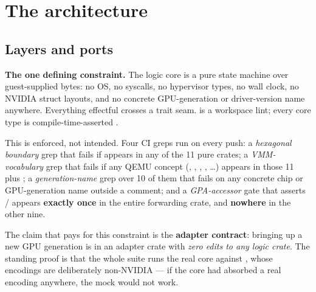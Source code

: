 \documentclass[10.5pt]{article}
\begin{document}
\section{The architecture}

\subsection{Layers and ports}

\begin{claimbox}\small
\textbf{The one defining constraint.} The logic core is a pure state machine over
guest-supplied bytes: no OS, no syscalls, no hypervisor types, no wall clock, no
\code{\#[repr(C)]} NVIDIA struct layouts, and no concrete GPU-generation or driver-version name
anywhere. Everything effectful crosses a trait seam.  is a
workspace lint; every core type is compile-time-asserted .
\end{claimbox}

This is enforced, not intended. Four CI greps run on every push: a \emph{hexagonal boundary}
grep that fails if  appears in any of the 11
pure crates; a \emph{VMM-vocabulary} grep that fails if any QEMU concept (,
, , , \dots) appears in those 11 plus
; a \emph{generation-name} grep over 10 of them that fails on any concrete chip
or GPU-generation name outside a comment; and a \emph{GPA-accessor} gate that asserts
/ appears \textbf{exactly once} in the entire forwarding
crate, and \textbf{nowhere} in the other nine.

The claim that pays for this constraint is the \textbf{adapter contract}: bringing up a new GPU
generation is  in an adapter crate with \emph{zero edits to any logic
crate}. The standing proof is that the whole suite runs the real core against ,
whose encodings are deliberately non-NVIDIA — if the core had absorbed a real encoding
anywhere, the mock would not work.
\end{document}
